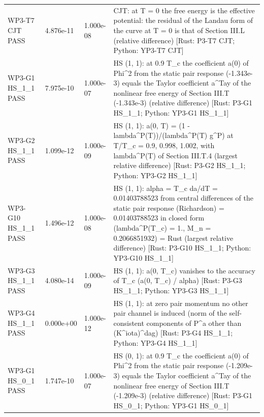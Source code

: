 \documentclass[aps,prd,onecolumn,superscriptaddress,nofootinbib,floatfix,longbibliography]{revtex4-2}
\begin{document}
\begin{longtable}{p{}p{}p{}p{}}
WP3-T7 CJT \newline PASS & 4.876e-11 & 1.000e-08 & CJT: at T = 0 the free energy is the effective potential: the residual of the Landau form of the curve at T = 0 is that of Section III.L (relative difference) [Rust: P3-T7 CJT; Python: YP3-T7 CJT] \\
WP3-G1 HS\_1\_1 \newline PASS & 7.975e-10 & 1.000e-07 & HS (1, 1): at 0.9 T\_c the coefficient a(0) of \textbar{}Phi\textbar{}\textasciicircum{}2 from the static pair response (-1.343e-3) equals the Taylor coefficient a\textasciicircum{}Tay of the nonlinear free energy of Section III.T (-1.343e-3) (relative difference) [Rust: P3-G1 HS\_1\_1; Python: YP3-G1 HS\_1\_1] \\
WP3-G2 HS\_1\_1 \newline PASS & 1.099e-12 & 1.000e-09 & HS (1, 1): a(0, T) = (1 - lambda\textasciicircum{}P(T))/(lambda\textasciicircum{}P(T) g\textasciicircum{}P) at T/T\_c = 0.9, 0.998, 1.002, with lambda\textasciicircum{}P(T) of Section III.T.4 (largest relative difference) [Rust: P3-G2 HS\_1\_1; Python: YP3-G2 HS\_1\_1] \\
WP3-G10 HS\_1\_1 \newline PASS & 1.496e-12 & 1.000e-08 & HS (1, 1): alpha = T\_c da/dT = 0.01403788523 from central differences of the static pair response (Richardson) = 0.01403788523 in closed form (lambda\textasciicircum{}P(T\_c) = 1., M\_n = 0.2066851932) = Rust (largest relative difference) [Rust: P3-G10 HS\_1\_1; Python: YP3-G10 HS\_1\_1] \\
WP3-G3 HS\_1\_1 \newline PASS & 4.080e-14 & 1.000e-09 & HS (1, 1): a(0, T\_c) vanishes to the accuracy of T\_c (\textbar{}a(0, T\_c)\textbar{} / alpha) [Rust: P3-G3 HS\_1\_1; Python: YP3-G3 HS\_1\_1] \\
WP3-G4 HS\_1\_1 \newline PASS & 0.000e+00 & 1.000e-12 & HS (1, 1): at zero pair momentum no other pair channel is induced (norm of the self-consistent components of P\textasciicircum{}a other than (K\textasciicircum{}iota)\textasciicircum{}dag) [Rust: P3-G4 HS\_1\_1; Python: YP3-G4 HS\_1\_1] \\
WP3-G1 HS\_0\_1 \newline PASS & 1.747e-10 & 1.000e-07 & HS (0, 1): at 0.9 T\_c the coefficient a(0) of \textbar{}Phi\textbar{}\textasciicircum{}2 from the static pair response (-1.209e-3) equals the Taylor coefficient a\textasciicircum{}Tay of the nonlinear free energy of Section III.T (-1.209e-3) (relative difference) [Rust: P3-G1 HS\_0\_1; Python: YP3-G1 HS\_0\_1] \\

\end{longtable}
\end{document}
